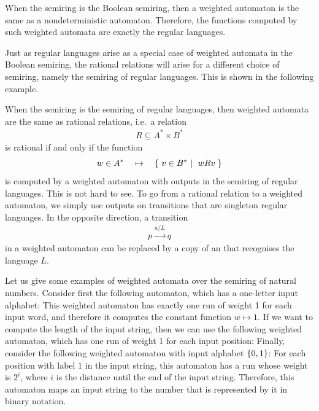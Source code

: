 \begin{myexample}
    When the semiring is the Boolean semiring, then a weighted automaton is the same as a nondeterministic automaton. Therefore, the functions computed by such weighted automata are exactly the regular languages.
\end{myexample}

Just as regular languages arise as a special case of weighted automata in the Boolean semiring, the rational relations will arise for a different choice of semiring, namely the semiring of regular languages. This is shown in the following example.

\begin{myexample}\label{ex:weighted-automata-semiring-regular-languages}
    When the semiring is the semiring of regular languages, then weighted automata are the same as rational relations, i.e.~a relation
    \begin{align*}
    R \subseteq A^* \times B^*
    \end{align*} 
    is rational if and only if the function 
    \begin{align*}
    w \in A^* \quad \mapsto \quad \setbuild{ v \in B^*}{$wRv$}
    \end{align*}
    is computed by a weighted automaton with outputs in the semiring of regular languages. This is not hard to see. To go from a rational relation to a weighted automaton, we simply use outputs on transitions that are singleton regular languages. In the opposite direction, a transition 
    \begin{align*}
      p \xrightarrow {a / L} q
    \end{align*}
    in a weighted automaton can be replaced by a copy of an \nfa that recognises the language $L$. 
\end{myexample}


\begin{myexample} \label{ex:weighted-automata-nat}
    Let us give some examples of weighted automata over the semiring of natural numbers. Consider first the following automaton, which has a one-letter input alphabet:
    This weighted automaton 
    has exactly one run of weight 1 for each input word, and therefore it computes the constant function $w \mapsto 1$. If we want to compute the length of the input string, then we can use the following weighted automaton, which has one run of weight 1 for each input position:
Finally, consider the following weighted automaton with input alphabet $\{0,1\}$:
    For each position with label $1$ in the input string, this automaton has a run whose weight is $2^i$, where $i$ is the distance until the end of the input string. Therefore, this automaton maps an input string to the number that is represented by it in binary notation.
\end{myexample}






